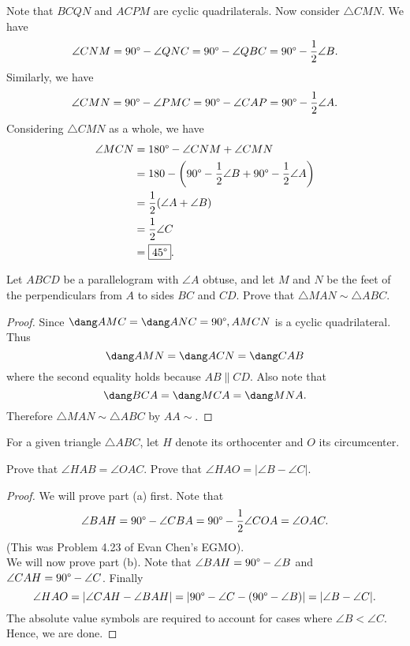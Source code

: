 \documentclass[letterpaper,oneside]{scrartcl}
\begin{document}
\begin{soln}
  Note that \(BCQN\) and \(ACPM\) are cyclic quadrilaterals. Now consider \(\triangle CMN\). We have
  \[\angle CNM = 90\degree - \angle QNC = 90\degree - \angle QBC = 90\degree - \frac12\angle B.\]
  Similarly, we have
  \[\angle CMN = 90\degree - \angle PMC = 90\degree - \angle CAP = 90\degree - \frac12\angle A.\]
  Considering \(\triangle CMN\) as a whole, we have
  \begin{align*}
    \angle MCN & = 180\degree - \angle CNM + \angle CMN                                        \\
               & = 180- \left(90\degree - \frac12\angle B + 90\degree - \frac12\angle A\right) \\
               & = \frac12(\angle A + \angle B)                                                \\
               & = \frac12\angle C                                                             \\
               & = \fbox{\(45\degree\)}.
  \end{align*}
\end{soln}
\begin{problem*}
  Let \(ABCD\) be a parallelogram with \(\angle A\) obtuse, and let \(M\) and \(N\) be the feet of the perpendiculars from \(A\) to sides \(BC\) and \(CD\). Prove that \(\triangle MAN \sim \triangle ABC\).
\end{problem*}
\begin{proof}
  Since \(\dang AMC = \dang ANC = 90\degree, AMCN\) is a cyclic quadrilateral. Thus
  \[\dang AMN = \dang ACN = \dang CAB\]
  where the second equality holds because \(AB \parallel CD\). Also note that
  \[\dang BCA = \dang MCA = \dang MNA.\]
  Therefore \(\triangle MAN \sim \triangle ABC\) by \(AA\sim\).
\end{proof}
\begin{problem*}
  For a given triangle \(\triangle ABC\), let \(H\) denote its orthocenter and \(O\) its circumcenter.
  \begin{enumerate}
    \ii[(a)] Prove that \(\angle HAB = \angle OAC\).
    \ii[(b)] Prove that \(\angle HAO = |\angle B - \angle C|\).
  \end{enumerate}
\end{problem*}
\begin{proof}
  We will prove part (a) first. Note that
  \[\angle BAH = 90\degree - \angle CBA = 90\degree - \frac12 \angle COA = \angle OAC.\]
  (This was Problem 4.23 of Evan Chen's EGMO).\\
  We will now prove part (b). Note that \(\angle BAH = 90\degree - \angle B\) and \(\angle CAH = 90\degree - \angle C\). Finally
  \[\angle HAO = |\angle CAH - \angle BAH| = |90\degree - \angle C - (90 \degree - \angle B)| = |\angle B - \angle C|.\]
  The absolute value symbols are required to account for cases where \(\angle B < \angle C\). Hence, we are done.
\end{proof}
\end{document}
